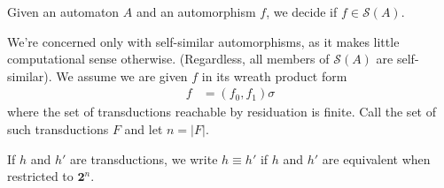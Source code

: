 \documentclass{amsart}
\newcommand{\0}{\underline{0}}
\newcommand{\1}{\underline{1}}
\newcommand{\2}{\underline{2}}
\begin{document}





Given an automaton $A$ and an automorphism $f$, we decide if $f \in \mathcal{S}(A)$.

We're concerned only with self-similar automorphisms, as it makes little computational sense otherwise. (Regardless, all members of $\mathcal{S}(A)$ are self-similar). We assume we are given $f$ in its wreath product form %
\begin{align*}
f &= (f_0, f_1)\sigma
\end{align*}
where the set of transductions reachable by residuation is finite. Call the set of such transductions $F$ and let $n = |F|$.

If $h$ and $h'$ are transductions, we write $h \equiv h'$ if $h$ and $h'$ are equivalent when restricted to $\textbf{2}^n$. 
\end{document}
